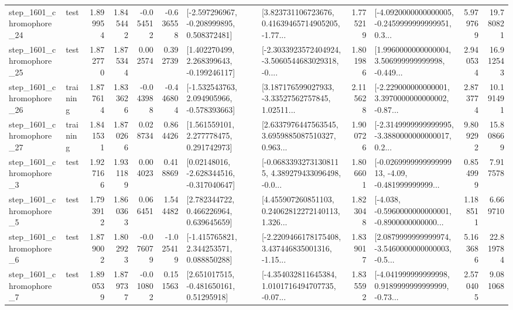 \begin{tabular}{llrrrrllrlrr}
 step\_1601\_chromophore\_24 &      test &      1.899954 &    1.845442 &     -0.054512 & -0.636558 &   [-2.597296967, -0.208999895, 0.508372481] &  [3.823731106723676, 0.41639465714905205, -1.77... &       1.775219 &  [-4.0920000000000005, -0.2459999999999951, 0.3... &            5.979769 &         19.780821 \\
 step\_1601\_chromophore\_25 &      test &      1.872770 &    1.875344 &      0.002574 &  0.392739 &    [1.402270499, 2.268399643, -0.199246117] &  [-2.3033923572404924, -3.5060544683029318, -0.... &       1.801986 &  [1.9960000000000004, 3.506999999999998, -0.449... &            2.940534 &         16.912543 \\
 step\_1601\_chromophore\_26 &  training &      1.877614 &    1.833626 &     -0.043988 & -0.446804 &   [-1.532543763, 2.094905966, -0.578393663] &  [3.187176599027933, -3.33527562757845, 1.02511... &       2.115628 &  [-2.229000000000001, 3.3970000000000002, -0.87... &            2.873774 &         10.191491 \\
 step\_1601\_chromophore\_27 &  training &      1.841531 &    1.870266 &      0.028734 &  0.864426 &     [1.561559101, 2.277778475, 0.291742973] &  [2.6337976447563545, 3.6959885087510327, 0.963... &       1.900726 &  [-2.3149999999999995, -3.3880000000000017, 0.2... &            9.809292 &         15.808669 \\
  step\_1601\_chromophore\_3 &      test &      1.927166 &    1.931189 &      0.004023 &  0.418869 &    [0.02148016, -2.628344516, -0.317040647] &  [-0.06833932731308115, 4.389279433096498, -0.0... &       1.806601 &  [-0.026999999999999913, -4.09, -0.481999999999... &            0.854999 &          7.917578 \\
  step\_1601\_chromophore\_5 &      test &      1.793912 &    1.860363 &      0.066451 &  1.544482 &     [2.782344722, 0.466226964, 0.639645659] &  [4.455907260851103, 0.24062812272140113, 1.326... &       1.823048 &  [-4.038, -0.5960000000000001, -0.8900000000000... &            1.188511 &          6.669710 \\
  step\_1601\_chromophore\_6 &      test &      1.879002 &    1.802923 &     -0.076079 & -1.025419 &    [-1.415765821, 2.344253571, 0.088850288] &  [-2.2209466178175408, 3.437446835001316, -1.15... &       1.839017 &  [2.0879999999999974, -3.5460000000000003, -0.5... &            5.163686 &         22.819784 \\
  step\_1601\_chromophore\_7 &      test &      1.890539 &    1.879737 &     -0.010802 &  0.151563 &     [2.651017515, -0.481650161, 0.51295918] &  [-4.354032811645384, 1.0101716494707735, -0.07... &       1.835592 &  [-4.041999999999998, 0.9189999999999999, -0.73... &            2.570405 &          9.081068 \\

\end{tabular}
